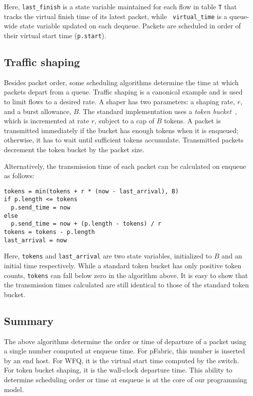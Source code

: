 Here, {\tt last\_finish} is a state variable maintained for each flow in table
{\tt T} that tracks the virtual finish time of its latest packet, while {\tt
virtual\_time} is a queue-wide state variable updated on each dequeue.  Packets
are scheduled in order of their virtual start time ({\tt p.start}).

\subsection{Traffic shaping}
Besides packet order, some scheduling algorithms determine the time at which
packets depart from a queue. Traffic shaping is a canonical example and is used
to limit flows to a desired rate. A shaper has two parameters: a shaping rate,
$r$, and a burst allowance, $B$. The standard implementation uses a {\em token
bucket}~\cite{tbf}, which is incremented at rate $r$, subject to a cap
of $B$ tokens. A packet is transmitted immediately if the bucket has enough
tokens when it is enqueued; otherwise, it has to wait until sufficient tokens
accumulate. Transmitted packets decrement the token bucket by the packet size.

Alternatively, the transmission time of each packet can be calculated
on enqueue as follows: 
\begin{lstlisting}[style=customc]
tokens = min(tokens + r * (now - last_arrival), B)
if p.length <= tokens
  p.send_time = now
else
  p.send_time = now + (p.length - tokens) / r
tokens = tokens - p.length
last_arrival = now
\end{lstlisting}

Here, {\tt tokens} and {\tt last\_arrival} are two state variables, initialized
to $B$ and an initial time respectively.  While a standard token bucket has
only positive token counts, {\tt tokens} can fall below zero in the algorithm
above.  It is easy to show that the transmission times calculated are still
identical to those of the standard token bucket.

\subsection{Summary}
The above algorithms determine the order or time of departure of a packet using
a single number computed at enqueue time. For pFabric, this number is inserted
by an end host. For WFQ, it is the virtual start time computed by the switch.
For token bucket shaping, it is the wall-clock departure time. This ability to
determine scheduling order or time at enqueue is at the core of our programming
model.
